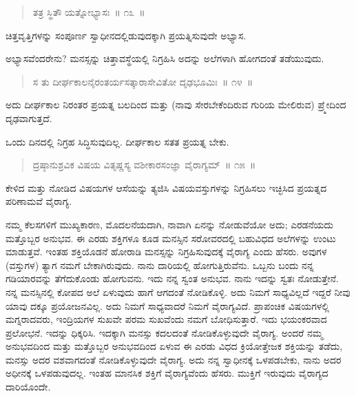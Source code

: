 \vspace{-0.2cm}

\begin{verse}
ತತ್ರ ಸ್ಥಿತೌ ಯತ್ನೋಭ್ಯಾಸಃ~॥ ೧೩~॥
\end{verse}

\vspace{-0.2cm}

ಚಿತ್ತವೃತ್ತಿಗಳನ್ನು ಸಂಪೂರ್ಣ ಸ್ವಾಧೀನದಲ್ಲಿಡುವುದಕ್ಕಾಗಿ ಪ್ರಯತ್ನಿಸುವುದೇ ಅಭ್ಯಾಸ. 

ಅಭ್ಯಾಸವೆಂದರೇನು? ಮನಸ್ಸನ್ನು ಚಿತ್ತಾವಸ್ಥೆಯಲ್ಲಿ ನಿಗ್ರಹಿಸಿ ಅದನ್ನು ಅಲೆಗಳಾಗಿ ಹೋಗದಂತೆ ತಡೆಯುವುದು. 

\vspace{-0.2cm}

\begin{verse}
ಸ ತು ದೀರ್ಘಕಾಲನೈರಂತರ್ಯಸತ್ಕಾರಾಸೇವಿತೋ ದೃಢಭೂಮಿಃ~॥ ೧೪~॥
\end{verse}

\vspace{-0.2cm}

ಅದು ದೀರ್ಘಕಾಲ ನಿರಂತರ ಪ್ರಯತ್ನ ಬಲದಿಂದ ಮತ್ತು (ನಾವು ಸೇರಬೇಕೆಂದಿರುವ ಗುರಿಯ ಮೇಲಿರುವ) ಪ್ರ್ಮೇದಿಂದ ದೃಢವಾಗುತ್ತದೆ. 

ಒಂದು ದಿನದಲ್ಲಿ ನಿಗ್ರಹ ಸಿದ್ಧಿಸುವುದಿಲ್ಲ. ದೀರ್ಘಕಾಲ ಸತತ ಪ್ರಯತ್ನ ಬೇಕು. 

\vspace{-0.2cm}

\begin{verse}
ದ್ರಷ್ಠಾನುಶ್ರವಿಕ ವಿಷಯ ವಿತೃಷ್ಣಸ್ಯ ವಶೀಕಾರಸಂಜ್ಞಾ ವೈರಾಗ್ಯಮ್​~॥ ೧೫~॥
\end{verse}

\vspace{-0.2cm}

ಕೇಳಿದ ಮತ್ತು ನೋಡಿದ ವಿಷಯಗಳ ಆಸೆಯನ್ನು ತ್ಯಜಿಸಿ ವಿಷಯವಸ್ತುಗಳನ್ನು ನಿಗ್ರಹಿಸಲು ಇಚ್ಛಿಸಿದ ಪ್ರಯತ್ನದ ಪರಿಣಾಮವೆ ವೈರಾಗ್ಯ. 

ನಮ್ಮ ಕೆಲಸಗಳಿಗೆ ಮುಖ್ಯಕಾರಣ, ಮೊದಲನೆಯದಾಗಿ, ನಾವಾಗಿ ಏನನ್ನು ನೋಡು\break ವೆಯೋ ಅದು; ಎರಡನೆಯದು ಮತ್ತೊಬ್ಬರ ಅನುಭವ. ಈ ಎರಡು ಶಕ್ತಿಗಳೂ ಕೂಡ ಮನಸ್ಸಿನ ಸರೋವರದಲ್ಲಿ ಬಹುವಿಧದ ಅಲೆಗಳನ್ನು ಉಂಟು ಮಾಡುತ್ತವೆ. ಇಂತಹ ಶಕ್ತಿಯೊಡನೆ ಹೋರಾಡಿ ಮನಸ್ಸನ್ನು ನಿಗ್ರಹಿಸುವುದಕ್ಕೆ ವೈರಾಗ್ಯ ಎಂದು ಹೆಸರು. ಅವುಗಳ (ವಸ್ತುಗಳ) ತ್ಯಾಗ ನಮಗೆ ಬೇಕಾಗಿರುವುದು. ನಾನು ದಾರಿಯಲ್ಲಿ ಹೋಗುತ್ತಿರುವೆನು. ಒಬ್ಬನು ಬಂದು ನನ್ನ ಗಡಿಯಾರವನ್ನು ತೆಗೆದುಕೊಂಡು ಹೋಗುವನು. ಇದು ನನ್ನ ಸ್ವಂತ ಅನುಭವ. ನಾನು ಇದನ್ನು ಸ್ವತಃ ನೋಡುತ್ತೇನೆ. ನನ್ನ ಮನಸ್ಸಿನಲ್ಲಿ ಕೋಪದ ಅಲೆ ಏಳುವುದು ಹಾಗೆ ಆಗದಂತೆ ನೋಡಿಕೊಳ್ಳಿ. ಅದು ನಿಮಗೆ ಸಾಧ್ಯವಿಲ್ಲದೆ ಇದ್ದರೆ ನೀವು ಯಾವು ದಕ್ಕೂ ಪ್ರಯೋಜನವಿಲ್ಲ. ಅದು ನಿಮಗೆ ಸಾಧ್ಯವಾದರೆ ನಿಮಗೆ ವೈರಾಗ್ಯವಿದೆ. ಪ್ರಾಪಂಚಿಕ ವಿಷಯಗಳಲ್ಲಿ ಮಗ್ನರಾದವರು, ಇಂದ್ರಿಯಗಳ ಸುಖವೇ ಪರಮ ಸುಖವೆಂದು ನಮಗೆ ಬೋಧಿಸುತ್ತಾರೆ. ಇದು ಭಯಂಕರವಾದ ಪ್ರಲೋಭನೆ. ಇದನ್ನು ಧಿಕ್ಕರಿಸಿ. ಇದಕ್ಕಾಗಿ ಮನಸ್ಸು ಕದಲದಂತೆ ನೋಡಿಕೊಳ್ಳುವುದೇ ವೈರಾಗ್ಯ. ಅಂದರೆ ನಮ್ಮ ಅನುಭವದಿಂದ ಮತ್ತು ಮತ್ತೊಬ್ಬರ ಅನುಭವದಿಂದ ಏಳುವ ಈ ಎರಡು ವಿಧದ ಕ್ರಿಯೋತ್ತೇಜಕ ಶಕ್ತಿಯನ್ನು ತಡೆದು, ಮನಸ್ಸು ಅದರ ವಶವಾಗದಂತೆ ನೋಡಿಕೊಳ್ಳುವುದೇ ವೈರಾಗ್ಯ. ಅದು ನನ್ನ ಸ್ವಾಧೀನಕ್ಕೆ ಒಳಪಡಬೇಕು, ನಾನು ಅದರ ಅಧೀನಕ್ಕೆ ಒಳಪಡುವುದಲ್ಲ. ಇಂತಹ ಮಾನಸಿಕ ಶಕ್ತಿಗೆ ವೈರಾಗ್ಯವೆಂದು ಹೆಸರು. ಮುಕ್ತಿಗೆ ಇರುವುದು ವೈರಾಗ್ಯದ ದಾರಿಯೊಂದೇ. 

